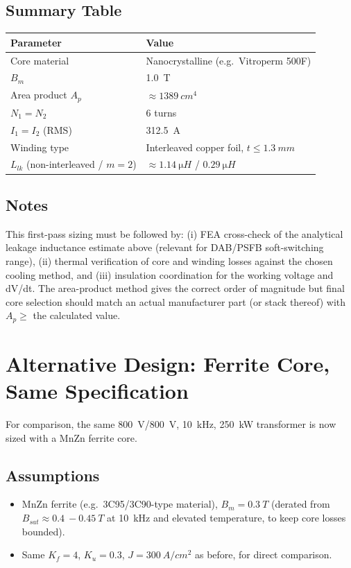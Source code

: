 \documentclass[11pt,a4paper]{article}
\begin{document}
\subsection*{Summary Table}
\begin{center}
\begin{tabular}{@{}ll@{}}
\toprule
Parameter & Value \\
\midrule
Core material & Nanocrystalline (e.g.\ Vitroperm 500F) \\
$B_m$ & \SI{1.0}{T} \\
Area product $A_p$ & $\approx \SI{1389}{cm^4}$ \\
$N_1 = N_2$ & 6 turns \\
$I_1 = I_2$ (RMS) & \SI{312.5}{A} \\
Winding type & Interleaved copper foil, $t \le \SI{1.3}{mm}$ \\
$L_{lk}$ (non-interleaved / $m{=}2$) & $\approx\SI{1.14}{\micro H}$ / $\SI{0.29}{\micro H}$ \\
\bottomrule
\end{tabular}
\end{center}

\subsection*{Notes}
This first-pass sizing must be followed by: (i) FEA cross-check of the analytical
leakage inductance estimate above (relevant for DAB/PSFB soft-switching range),
(ii) thermal verification of core and winding losses against the chosen cooling
method, and (iii) insulation coordination for the working voltage and dV/dt. The
area-product method gives the correct order of magnitude but final core selection
should match an actual manufacturer part (or stack thereof) with $A_p \ge$ the
calculated value.

\section{Alternative Design: Ferrite Core, Same Specification}
For comparison, the same \SI{800}{V}/\SI{800}{V}, \SI{10}{kHz}, \SI{250}{kW}
transformer is now sized with a MnZn ferrite core.

\subsection*{Assumptions}
\begin{itemize}
    \item MnZn ferrite (e.g.\ 3C95/3C90-type material), $B_m=\SI{0.3}{T}$
    (derated from $B_{sat}\approx\SI{0.4}{-}\SI{0.45}{T}$ at \SI{10}{kHz} and
    elevated temperature, to keep core losses bounded).
    \item Same $K_f=4$, $K_u=0.3$, $J=\SI{300}{A/cm^2}$ as before, for direct
    comparison.
\end{itemize}
\end{document}
